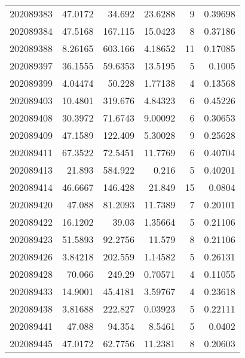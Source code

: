 \begin{tabular}{rrrrrr}
 202089383 &         47.0172  &       34.692  &           23.6288  &           9 & 0.39698 \\
 202089384 &         47.5168  &      167.115  &           15.0423  &           8 & 0.37186 \\
 202089388 &          8.26165 &      603.166  &            4.18652 &          11 & 0.17085 \\
 202089397 &         36.1555  &       59.6353 &           13.5195  &           5 & 0.1005  \\
 202089399 &          4.04474 &       50.228  &            1.77138 &           4 & 0.13568 \\
 202089403 &         10.4801  &      319.676  &            4.84323 &           6 & 0.45226 \\
 202089408 &         30.3972  &       71.6743 &            9.00092 &           6 & 0.30653 \\
 202089409 &         47.1589  &      122.409  &            5.30028 &           9 & 0.25628 \\
 202089411 &         67.3522  &       72.5451 &           11.7769  &           6 & 0.40704 \\
 202089413 &         21.893   &      584.922  &            0.216   &           5 & 0.40201 \\
 202089414 &         46.6667  &      146.428  &           21.849   &          15 & 0.0804  \\
 202089420 &         47.088   &       81.2093 &           11.7389  &           7 & 0.20101 \\
 202089422 &         16.1202  &       39.03   &            1.35664 &           5 & 0.21106 \\
 202089423 &         51.5893  &       92.2756 &           11.579   &           8 & 0.21106 \\
 202089426 &          3.84218 &      202.559  &            1.14582 &           5 & 0.26131 \\
 202089428 &         70.066   &      249.29   &            0.70571 &           4 & 0.11055 \\
 202089433 &         14.9001  &       45.4181 &            3.59767 &           4 & 0.23618 \\
 202089438 &          3.81688 &      222.827  &            0.03923 &           5 & 0.22111 \\
 202089441 &         47.088   &       94.354  &            8.5461  &           5 & 0.0402  \\
 202089445 &         47.0172  &       62.7756 &           11.2381  &           8 & 0.20603 \\

\end{tabular}
